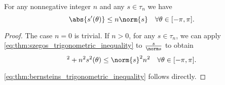 \begin{corollary}\label{thm:bernsteins_trigonometric_inequality}
  For any nonnegative integer \( n \) and any \( s \in \tau_n \) we have
  \begin{equation}\label{eq:thm:bernsteins_trigonometric_inequality}
    \abs{s'(\theta)} \leq n \norm{s} \quad\forall \theta \in [-\pi, \pi].
  \end{equation}
\end{corollary}
\begin{proof}
  The case \( n = 0 \) is trivial. If \( n > 0 \), for any \( s \in \tau_n \), we can apply \eqref{eq:thm:szegos_trigonometric_inequality} to \( \frac s {\norm s} \) to obtain
  \begin{equation}
    [s'(\theta)]^2 + n^2 s^2 (\theta) \leq \norm{s}^2 n^2 \quad\forall \theta \in [-\pi, \pi].
  \end{equation}

  \eqref{eq:thm:bernsteins_trigonometric_inequality} follows directly.
\end{proof}

